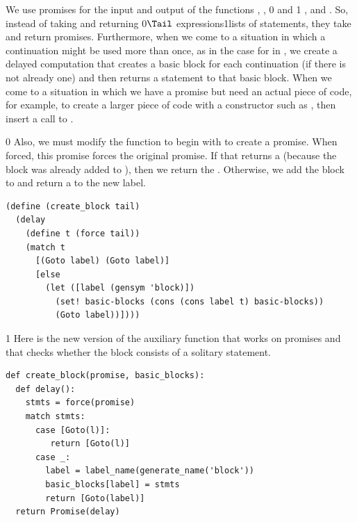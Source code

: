 \documentclass[7x10]{TimesAPriori_MIT}%
\def\racketEd{0}
\def\pythonEd{1}
\def\edition{1}
\newcommand{\racket}[1]{{\if\edition\racketEd{#1}\fi}}
\newcommand{\pythonColor}[0]{}
\newcommand{\python}[1]{{\if\edition\pythonEd\pythonColor #1\fi}}
\numberwithin{theorem}{chapter}
\numberwithin{definition}{chapter}
\numberwithin{equation}{chapter}
\begin{document}
We use promises for the input and output of the functions
, ,
%
\racket{ and }\python{ , and }.
%
So, instead of taking and returning \racket{$\Tail$
  expressions}\python{lists of statements}, they take and return
promises. Furthermore, when we come to a situation in which a
continuation might be used more than once, as in the case for
 in , we create a delayed computation
that creates a basic block for each continuation (if there is not
already one) and then returns a  statement to that basic
block. When we come to a situation in which we have a promise but need an
actual piece of code, for example, to create a larger piece of code with a
constructor such as , then insert a call to .
%
{\if\edition\racketEd
%
Also, we must modify the  function to begin with
 to create a promise. When forced, this promise forces the
original promise. If that returns a  (because the block was
already added to ), then we return the
. Otherwise, we add the block to  and
return a  to the new label.
\begin{center}
\begin{minipage}{\textwidth}
\begin{lstlisting}
(define (create_block tail)
  (delay
    (define t (force tail))
    (match t
      [(Goto label) (Goto label)]
      [else
        (let ([label (gensym 'block)])
          (set! basic-blocks (cons (cons label t) basic-blocks))
          (Goto label))])))
\end{lstlisting}
\end{minipage}
\end{center}
\fi}

{\if\edition\pythonEd\pythonColor
%
Here is the new version of the  auxiliary function
that works on promises and that checks whether the block consists of a
solitary  statement.\\
\begin{minipage}{\textwidth}
\begin{lstlisting}
def create_block(promise, basic_blocks):
  def delay():
    stmts = force(promise)
    match stmts:
      case [Goto(l)]:
         return [Goto(l)]
      case _:
        label = label_name(generate_name('block'))
        basic_blocks[label] = stmts
        return [Goto(label)]
  return Promise(delay)
\end{lstlisting}
\end{minipage}

\fi}
\end{document}
